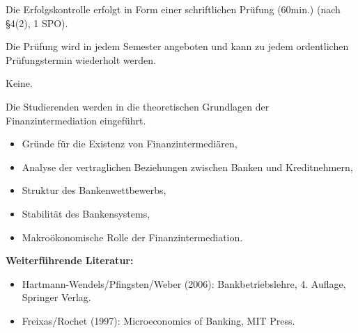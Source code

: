 \begin{course}

\setdoclanguagegerman
{}



\coursehead


\label{cour_6749.dp_997}


\begin{styleenv}
\begin{assessment}
Die Erfolgskontrolle erfolgt in Form einer schriftlichen Prüfung (60min.) (nach §4(2), 1 SPO).

 

Die Prüfung wird in jedem Semester angeboten und kann zu jedem ordentlichen Prüfungstermin wiederholt werden.


\end{assessment}

\begin{conditions}Keine.\end{conditions}


\end{styleenv}

\begin{learningoutcomes}
Die Studierenden werden in die theoretischen Grundlagen der Finanzintermediation eingeführt.


\end{learningoutcomes}

\begin{content}
\begin{itemize}\item Gründe für die Existenz von Finanzintermediären,  \item Analyse der vertraglichen Beziehungen zwischen Banken und Kreditnehmern,  \item Struktur des Bankenwettbewerbs,  \item Stabilität des Bankensystems,  \item Makroökonomische Rolle der Finanzintermediation.  \end{itemize}
\end{content}



\begin{literature}\textbf{Weiterführende Literatur:}

 \begin{itemize}\item Hartmann-Wendels/Pfingsten/Weber (2006): Bankbetriebslehre, 4. Auflage, Springer Verlag.  \item Freixas/Rochet (1997): Microeconomics of Banking, MIT Press.  \end{itemize}\end{literature}



\end{course}